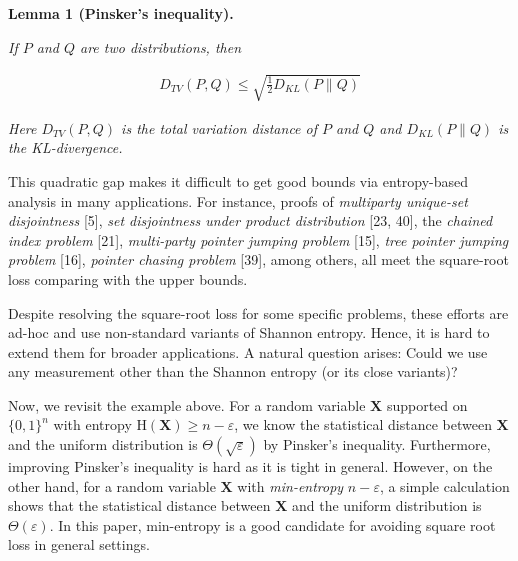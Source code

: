 

\par\medskip\noindent\textbf{
\textbf{Lemma 1}\textbf{ }(Pinsker’s inequality)\textbf{.}
}\par



\emph{If $P$ and $Q$ are two distributions, then}\par


\[\begin{gathered}
D_{TV}(P,Q)\leq\sqrt{\frac{1}{2}D_{KL}(P\|Q)}
\end{gathered}\]


\emph{Here $D_{TV}(P,Q)$ is the total variation distance of $P$ and $Q$ and $D_{KL}(P\|Q)$ is the KL-divergence.}\par






This quadratic gap makes it difficult to get good bounds via entropy-based analysis in many applications. For instance, proofs of \emph{multiparty unique-set disjointness} [5], \emph{set disjointness under product distribution} [23, 40], the \emph{chained index problem} [21], \emph{multi-party pointer jumping problem} [15], \emph{tree pointer jumping problem} [16], \emph{pointer chasing problem} [39], among others, all meet the square-root loss comparing with the upper bounds.\par




Despite resolving the square-root loss for some specific problems, these efforts are ad-hoc and use non-standard variants of Shannon entropy. Hence, it is hard to extend them for broader applications. A natural question arises: Could we use any measurement other than the Shannon entropy (or its close variants)?\par




Now, we revisit the example above. For a random variable $\bm{X}$ supported on $\{0,1\}^{n}$ with entropy $\text{H}(\bm{X})\geq n-\varepsilon$, we know the statistical distance between $\bm{X}$ and the uniform distribution is $\Theta(\sqrt{\varepsilon})$ by Pinsker’s inequality. Furthermore, improving Pinsker’s inequality is hard as it is tight in general. However, on the other hand, for a random variable $\bm{X}$ with \emph{min-entropy} $n-\varepsilon$, a simple calculation shows that the statistical distance between $\bm{X}$ and the uniform distribution is $\Theta(\varepsilon)$. In this paper, min-entropy is a good candidate for avoiding square root loss in general settings.\par





